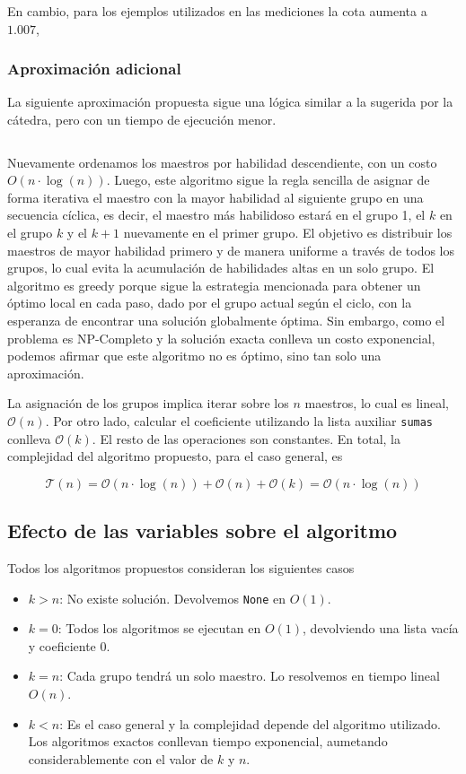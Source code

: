 \documentclass{article}
\begin{document}
En cambio, para los ejemplos utilizados en las mediciones la cota aumenta a $1.007$,

\subsubsection{Aproximación adicional}

La siguiente aproximación propuesta sigue una lógica similar a la sugerida por la cátedra, pero con un tiempo de ejecución menor.

\inputminted[linenos, firstline=3, lastline=33]{python}{codigo/aproximacion_adicional.py}

Nuevamente ordenamos los maestros por habilidad descendiente, con un costo $O(n\cdot \log(n))$. Luego, este algoritmo sigue la regla sencilla de asignar de forma iterativa el maestro con la mayor habilidad al siguiente grupo en una secuencia cíclica, es decir, el maestro más habilidoso estará en el grupo 1, el $k$ en el grupo $k$ y el $k+1$ nuevamente en el primer grupo. El objetivo es distribuir los maestros de mayor habilidad primero y de manera uniforme a través de todos los grupos, lo cual evita la acumulación de habilidades altas en un solo grupo. El algoritmo es greedy porque sigue la estrategia mencionada para obtener un óptimo local en cada paso, dado por el grupo actual según el ciclo, con la esperanza de encontrar una solución globalmente óptima. Sin embargo, como el problema es NP-Completo y la solución exacta conlleva un costo exponencial, podemos afirmar que este algoritmo no es óptimo, sino tan solo una aproximación. 

La asignación de los grupos implica iterar sobre los $n$ maestros, lo cual es lineal, $\mathcal{O}(n)$. Por otro lado, calcular el coeficiente utilizando la lista auxiliar \texttt{sumas} conlleva $\mathcal{O}(k)$. El resto de las operaciones son constantes. En total, la complejidad del algoritmo propuesto, para el caso general, es

$$
\mathcal{T}(n) = \mathcal{O}(n \cdot \log (n)) + \mathcal{O}(n) + \mathcal{O}(k) = \mathcal{O}(n \cdot \log (n))
$$

\subsection{Efecto de las variables sobre el algoritmo}
Todos los algoritmos propuestos consideran los siguientes casos
\begin{itemize}
    \item $k > n$: No existe solución. Devolvemos \texttt{None} en $O(1)$.
    \item $k = 0$: Todos los algoritmos se ejecutan en $O(1)$, devolviendo una lista vacía y coeficiente 0. 
    \item $k = n$: Cada grupo tendrá un solo maestro. Lo resolvemos en tiempo lineal $O(n)$.
    \item $k < n$: Es el caso general y la complejidad depende del algoritmo utilizado. Los algoritmos exactos conllevan tiempo exponencial, aumetando considerablemente con el valor de $k$ y $n$.
\end{itemize}
\end{document}
